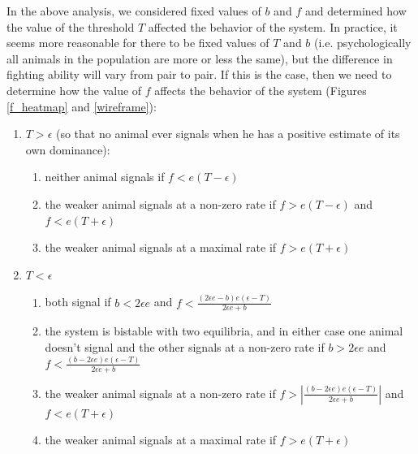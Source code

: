 \documentclass{article}
\begin{document}
In the above analysis, we considered fixed values of $b$ and $f$ and determined how the value of the threshold $T$ affected the behavior of the system.  In practice, it seems more reasonable for there to be fixed values of $T$ and $b$ (i.e. psychologically all animals in the population are more or less the same), but the difference in fighting ability will vary from pair to pair.  If this is the case, then we need to determine how the value of $f$ affects the behavior of the system (Figures \ref{f_heatmap} and \ref{wireframe}):
\begin{enumerate}
\item $T>\epsilon$ (so that no animal ever signals when he has a positive estimate of its own dominance):
\begin{enumerate}
\item neither animal signals if $f<e(T-\epsilon)$ 
\item the weaker animal signals at a non-zero rate if $f>e(T-\epsilon)$ and $f<e(T+\epsilon)$
\item the weaker animal signals at a maximal rate if $f>e(T+\epsilon)$
\end{enumerate}
\item $T<\epsilon$
\begin{enumerate}
\item both signal if $b<2\epsilon e$ and $f<\frac{(2\epsilon e-b)e(\epsilon-T)}{2\epsilon e+b}$
\item the system is bistable with two equilibria, and in either case one animal doesn't signal and the other signals at a non-zero rate if $b>2\epsilon e$ and $f<\frac{(b-2\epsilon e)e(\epsilon-T)}{2\epsilon e+b}$
\item the weaker animal signals at a non-zero rate if $f>\left|\frac{(b-2\epsilon e)e(\epsilon-T)}{2\epsilon e+b}\right|$ and $f<e(T+\epsilon)$
\item the weaker animal signals at a maximal rate if $f>e(T+\epsilon)$
\end{enumerate}
\end{enumerate}
\end{document}
